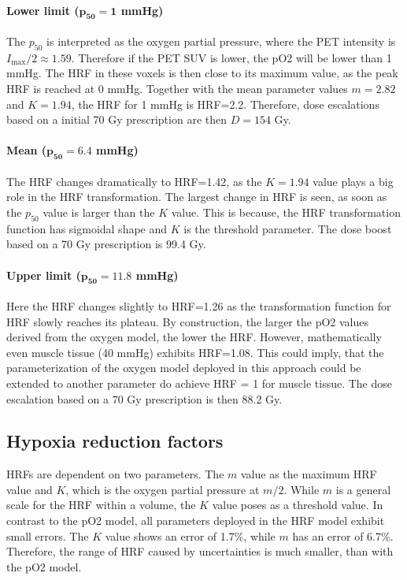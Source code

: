 \paragraph{Lower limit ($\mathbf{p_{50}=1}$ mmHg)}The $p_{50}$ is interpreted as the oxygen partial pressure, where the PET intensity is $I_\mathrm{max}/2\approx 1.59$. Therefore if the PET SUV is lower, the pO2 will be lower than 1 mmHg. The HRF in these voxels is then close to its maximum value, as the peak HRF is reached at 0 mmHg. Together with the mean parameter values $m=2.82$ and $K=1.94$, the HRF for 1 mmHg is HRF=2.2. Therefore, dose escalations based on a initial 70 Gy prescription are then $D=154$ Gy.
\paragraph{Mean ($\mathbf{p_{50}=6.4}$ mmHg)}The HRF changes dramatically to HRF=1.42, as the $K=1.94$ value plays a big role in the HRF transformation. The largest change in HRF is seen, as soon as the $p_{50}$ value is larger than the $K$ value. This is because, the HRF transformation function has sigmoidal shape and $K$ is the threshold parameter. The dose boost based on a 70 Gy prescription is 99.4 Gy.
\paragraph{Upper limit ($\mathbf{p_{50}=11.8}$ mmHg)}Here the HRF changes slightly to HRF=1.26 as the transformation function for HRF slowly reaches its plateau. By construction, the larger the pO2 values derived from the oxygen model, the lower the HRF. However, mathematically even muscle tissue (40 mmHg) exhibits HRF=1.08. This could imply, that the parameterization of the oxygen model deployed in this approach could be extended to another parameter do achieve HRF = 1 for muscle tissue. The dose escalation based on a 70 Gy prescription is then 88.2 Gy.
\subsection{Hypoxia reduction factors}
HRFs are dependent on two parameters. The $m$ value as the maximum HRF value and $K$, which is the oxygen partial pressure at $m/2$. While $m$ is a general scale for the HRF within a volume, the $K$ value poses as a threshold value. In contrast to the pO2 model, all parameters deployed in the HRF model exhibit small errors. The $K$ value shows an error of 1.7\%, while $m$ has an error of 6.7\%. Therefore, the range of HRF caused by uncertainties is much smaller, than with the pO2 model.
